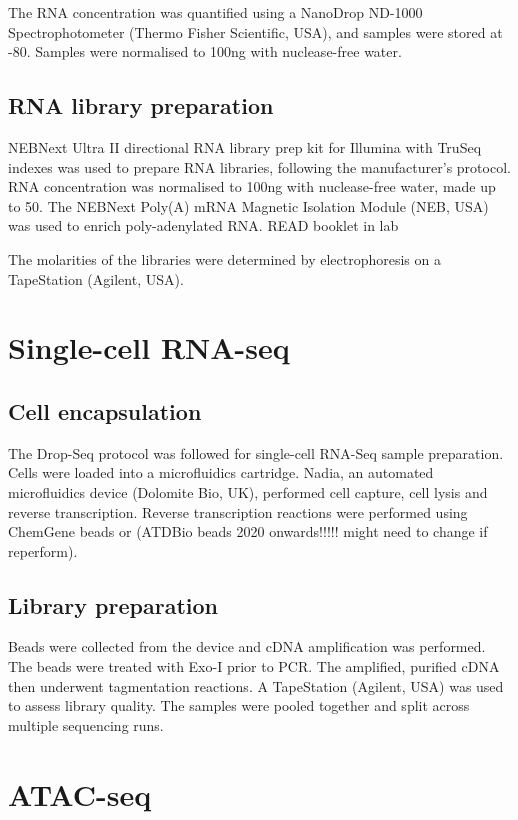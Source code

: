 The RNA concentration was quantified using a NanoDrop ND-1000 Spectrophotometer (Thermo Fisher Scientific, USA), and samples were stored at -80\C{}.
Samples were normalised to 100\si{\ng} with nuclease-free water.


\subsection{RNA library preparation}
NEBNext\textsuperscript{\textregistered} Ultra II directional RNA library prep kit for Illumina\textsuperscript{\textregistered} with TruSeq indexes was used to prepare RNA libraries, following the manufacturer's protocol.
RNA concentration was normalised to 100\si{\ng} with nuclease-free water, made up to 50\ul{}.
The NEBNext Poly(A) mRNA Magnetic Isolation Module (NEB, USA) was used to enrich poly-adenylated RNA. READ booklet in lab


The molarities of the libraries were determined by electrophoresis on a TapeStation (Agilent, USA).

\section{Single-cell RNA-seq}
\subsection{Cell encapsulation}
The Drop-Seq protocol\cite{macosko2015highly} was followed for single-cell RNA-Seq sample preparation.
Cells were loaded into a microfluidics cartridge.
Nadia, an automated microfluidics device (Dolomite Bio, UK), performed cell capture, cell lysis and reverse transcription.
Reverse transcription reactions were performed using ChemGene beads or (ATDBio beads 2020 onwards!!!!! might need to change if reperform).

\subsection{Library preparation}
Beads were collected from the device and cDNA amplification was performed.
The beads were treated with Exo-I prior to PCR.
The amplified, purified cDNA then underwent tagmentation reactions.
A TapeStation (Agilent, USA) was used to assess library quality.
The samples were pooled together and split across multiple sequencing runs.


\section{ATAC-seq}\label{sec:methods_atac}

